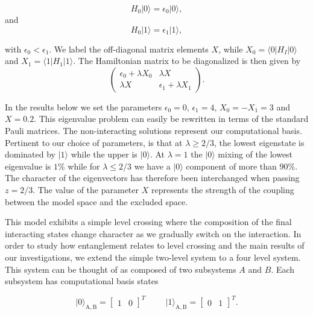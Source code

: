 \documentclass[twocolumn,superscriptaddress,unsortedaddress,
 amsmath,amssymb,
 aps,
]{revtex4-2}
\begin{document}
\[
       H_0\vert 0 \rangle =\epsilon_0\vert 0 \rangle,
\]
and
\[
       H_0\vert 1\rangle =\epsilon_1\vert 1\rangle,
\]

with $\epsilon_0 < \epsilon_1$. We label the off-diagonal matrix
elements $X$, while $X_0=\langle 0 \vert H_I\vert 0 \rangle$ and
$X_1=\langle 1 \vert H_1\vert 1 \rangle$.  The Hamiltonian matrix to be diagonalized is then given by
\[
\left(\begin{array}{cc}\epsilon_0+\lambda X_0 &\lambda X \\
\lambda X &\epsilon_1+\lambda X_1 \end{array}\right).
\]

In the results below we set the parameters $\epsilon_0=0$,
$\epsilon_1=4$, $X_0=-X_1=3$ and $X=0.2$.  This eigenvalue problem can
easily be rewritten in terms of the standard Pauli matrices.  The
non-interacting solutions represent our computational basis.
Pertinent to our choice of parameters, is that at $\lambda\geq 2/3$,
the lowest eigenstate is dominated by $\vert 1\rangle$ while the upper
is $\vert 0 \rangle$. At $\lambda=1$ the $\vert 0 \rangle$ mixing of
the lowest eigenvalue is $1\%$ while for $\lambda\leq 2/3$ we have a
$\vert 0 \rangle$ component of more than $90\%$.  The character of the
eigenvectors has therefore been interchanged when passing $z=2/3$. The
value of the parameter $X$ represents the strength of the coupling
between the model space and the excluded space.  

This  model exhibits a simple level crossing where the
composition of the final interacting states change character as we
gradually switch on the interaction.  In order to study how
entanglement relates to level crossing and the main results of our
investigations, we extend the simple two-level system to a four level
system. This system can be thought of as composed of two subsystems
$A$ and $B$. Each subsystem has computational basis states

\[
\vert 0\rangle_{\mathrm{A,B}}=\begin{bmatrix} 1 & 0\end{bmatrix}^T \hspace{1cm} \vert 1\rangle_{\mathrm{A,B}}=\begin{bmatrix} 0 & 1\end{bmatrix}^T.
\]
\end{document}
